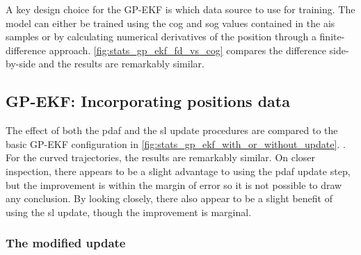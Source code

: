 A key design choice for the GP-EKF is which data source to use for training. The model can either be trained using the \acrshort{cog} and \acrshort{sog} values contained in the \acrshort{ais} samples or by calculating numerical derivatives of the position through a finite-difference approach. \cref{fig:stats_gp_ekf_fd_vs_cog} compares the difference side-by-side and the results are remarkably similar.

\subsection{GP-EKF: Incorporating positions data}
The effect of both the \acrshort{pdaf} and the \acrshort{sl} update procedures are compared to the basic GP-EKF configuration in \cref{fig:stats_gp_ekf_with_or_without_update}. . For the curved trajectories, the results are remarkably similar. On closer inspection, there appears to be a slight advantage to using the \acrshort{pdaf} update step, but the improvement is within the margin of error so it is not possible to draw any conclusion. By looking closely, there also appear to be a slight benefit of using the \acrshort{sl} update, though the improvement is marginal.




\subsubsection{The modified update}





